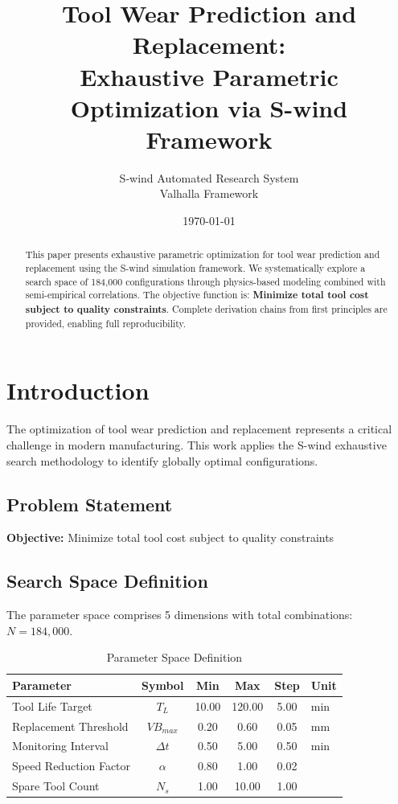 \documentclass[11pt,twocolumn]{article}
\title{Tool Wear Prediction and Replacement: \\Exhaustive Parametric Optimization via S-wind Framework}
\author{S-wind Automated Research System\\Valhalla Framework}
\date{\today}
\begin{document}
\maketitle

\begin{abstract}
This paper presents exhaustive parametric optimization for tool wear prediction and replacement using the S-wind simulation framework.
We systematically explore a search space of 184,000 configurations through physics-based modeling
combined with semi-empirical correlations. The objective function is: \textbf{Minimize total tool cost subject to quality constraints}.
Complete derivation chains from first principles are provided, enabling full reproducibility.
\end{abstract}

\section{Introduction}
The optimization of tool wear prediction and replacement represents a critical challenge in modern manufacturing.
This work applies the S-wind exhaustive search methodology to identify globally optimal configurations.

\subsection{Problem Statement}
\textbf{Objective:} Minimize total tool cost subject to quality constraints

\subsection{Search Space Definition}
The parameter space comprises 5 dimensions with total combinations: $N = 184,000$.

\begin{table}[h]
\centering
\caption{Parameter Space Definition}
\begin{tabular}{@{}lccccl@{}}
\toprule
Parameter & Symbol & Min & Max & Step & Unit \\
\midrule
Tool Life Target & $T_L$ & 10.00 & 120.00 & 5.00 & min \\
Replacement Threshold & $VB_{max}$ & 0.20 & 0.60 & 0.05 & mm \\
Monitoring Interval & $\Delta t$ & 0.50 & 5.00 & 0.50 & min \\
Speed Reduction Factor & $\alpha$ & 0.80 & 1.00 & 0.02 &  \\
Spare Tool Count & $N_s$ & 1.00 & 10.00 & 1.00 &  \\
\bottomrule
\end{tabular}
\end{table}
\end{document}
